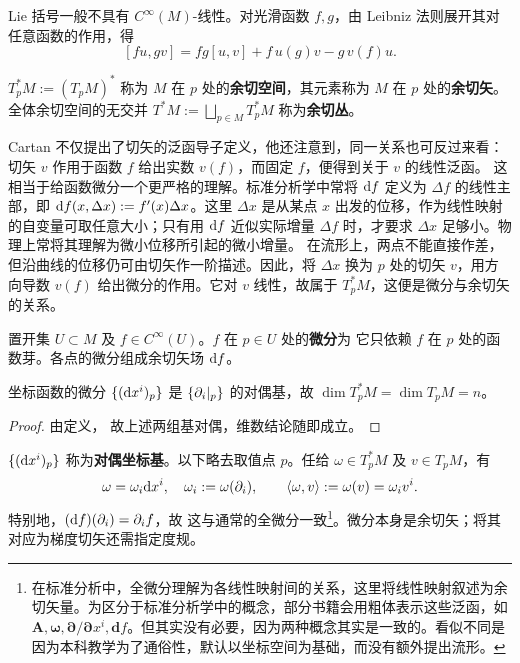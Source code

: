 Lie 括号一般不具有 $C^\infty(M)$-线性。对光滑函数 $f,g$，由 Leibniz 法则展开其对任意函数的作用，得
\[
    [fu,gv]=fg[u,v]+f\,u(g)v-g\,v(f)u.
\]

\begin{definition}
    $T^*_p M:=(T_p M)^*$ 称为 $M$ 在 $p$ 处的\textbf{余切空间}，其元素称为 $M$ 在 $p$ 处的\textbf{余切矢}。
    全体余切空间的无交并 $T^*M:=\bigsqcup_{p\in M} T^*_p M$ 称为\textbf{余切丛}。
\end{definition}

Cartan 不仅提出了切矢的泛函导子定义，他还注意到，同一关系也可反过来看：切矢 $v$ 作用于函数 $f$ 给出实数 $v(f)$，而固定 $f$，便得到关于 $v$ 的线性泛函。
这相当于给函数微分一个更严格的理解。标准分析学中常将 $\dd f$ 定义为 $\Delta f$ 的线性主部，即 $\dd f(x,\Delta x):=f'(x)\Delta x$。这里 $\Delta x$ 是从某点 $x$ 出发的位移，作为线性映射的自变量可取任意大小；只有用 $\dd f$ 近似实际增量 $\Delta f$ 时，才要求 $\Delta x$ 足够小。物理上常将其理解为微小位移所引起的微小增量。
在流形上，两点不能直接作差，但沿曲线的位移仍可由切矢作一阶描述。因此，将 $\Delta x$ 换为 $p$ 处的切矢 $v$，用方向导数 $v(f)$ 给出微分的作用。它对 $v$ 线性，故属于 $T_p^*M$，这便是微分与余切矢的关系。

\begin{definition}
    置开集 $U\subset M$ 及 $f\in C^\infty(U)$。$f$ 在 $p\in U$ 处的\textbf{微分}为
    它只依赖 $f$ 在 $p$ 处的函数芽。各点的微分组成余切矢场 $\dd f$。
\end{definition}

\begin{theorem}
    坐标函数的微分 $\{(\dd x^i)_p\}$ 是 $\{\partial_i|_p\}$ 的对偶基，故 $\dim T_p^*M=\dim T_pM=n$。
\end{theorem}
\begin{proof}
    由定义，
    故上述两组基对偶，维数结论随即成立。
\end{proof}

$\{(\dd x^i)_p\}$ 称为\textbf{对偶坐标基}。以下略去取值点 $p$。任给 $\omega\in T_p^*M$ 及 $v\in T_pM$，有
\[
    \omega=\omega_i\dd x^i,\quad \omega_i:=\omega(\partial_i),\qquad
    \langle\omega,v\rangle:=\omega(v)=\omega_i v^i.
\]
特别地，$(\dd f)(\partial_i)=\partial_i f$，故
这与通常的全微分一致\footnote{在标准分析中，全微分理解为各线性映射间的关系，这里将线性映射叙述为余切矢量。为区分于标准分析学中的概念，部分书籍会用粗体表示这些泛函，如 $\bm A,\bm\omega,\bm{\partial}/{\bm{\partial}x^i},\mathbf{d}f$。但其实没有必要，因为两种概念其实是一致的。看似不同是因为本科教学为了通俗性，默认以坐标空间为基础，而没有额外提出流形。}。微分本身是余切矢；将其对应为梯度切矢还需指定度规。

